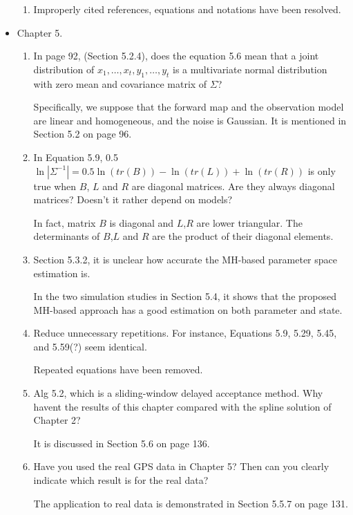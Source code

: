 \documentclass[a4paper,18pt]{extarticle}
\begin{document}
\begin{itemize}
\begin{enumerate}
	\item Improperly cited references, equations and notations have been resolved. 
	
	\end{enumerate}
	
	\item  Chapter 5. 
	\begin{enumerate}
	
	\item  In page 92, (Section 5.2.4), does the equation 5.6 mean that a joint distribution of $x_1,\ldots,x_t,y_1,\ldots,y_t$ is a multivariate normal distribution with zero mean and covariance matrix of $\Sigma$?

	Specifically, we suppose that the forward map and the observation model are linear and homogeneous, and the noise is Gaussian. It is mentioned in Section 5.2 on page 96.
	
	\item In Equation 5.9, 0.5 $\ln |\Sigma^{-1}| = 0.5\ln(tr(B))-\ln(tr(L))+
\ln(tr(R))$ is only true when $B$, $L$ and $R$ are diagonal matrices. Are they always diagonal matrices? Doesn’t it rather depend on models?

	In fact, matrix $B$ is diagonal and $L$,$R$ are lower triangular. The determinants of $B$,$L$ and $R$ are the product of their diagonal elements. 
		
	\item Section 5.3.2, it is unclear how accurate the MH-based parameter space estimation is.
	
	In the two simulation studies in Section 5.4, it shows that the proposed MH-based approach has a good estimation on both parameter and state.
	
	\item Reduce unnecessary repetitions. For instance, Equations 5.9, 5.29, 5.45, and 5.59(?) seem identical. 
		
	Repeated equations have been removed.  
		
	\item Alg 5.2, which is a sliding-window delayed acceptance method. Why havent the results of this chapter compared with the spline solution of Chapter 2?
		
	It is discussed in Section 5.6 on page 136.	
		
	\item Have you used the real GPS data in Chapter 5? Then can you clearly indicate which result is for the real data?
		
	The application to real data is demonstrated in Section 5.5.7 on page 131.
		 
	\end{enumerate}
	

\end{itemize}
\end{document}
